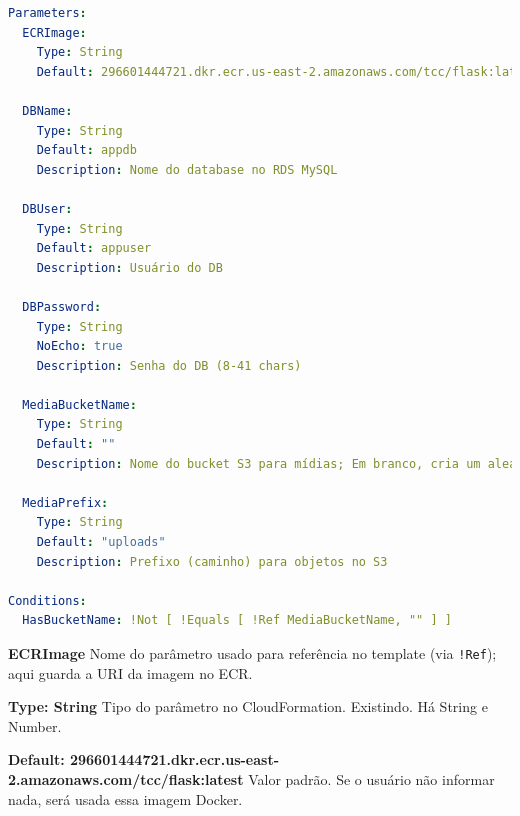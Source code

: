 \begin{lstlisting}[language=YAML]
Parameters:
  ECRImage:
    Type: String
    Default: 296601444721.dkr.ecr.us-east-2.amazonaws.com/tcc/flask:latest

  DBName:
    Type: String
    Default: appdb
    Description: Nome do database no RDS MySQL

  DBUser:
    Type: String
    Default: appuser
    Description: Usuário do DB

  DBPassword:
    Type: String
    NoEcho: true
    Description: Senha do DB (8-41 chars)

  MediaBucketName:
    Type: String
    Default: ""
    Description: Nome do bucket S3 para mídias; Em branco, cria um aleatório 

  MediaPrefix:
    Type: String
    Default: "uploads"
    Description: Prefixo (caminho) para objetos no S3

Conditions:
  HasBucketName: !Not [ !Equals [ !Ref MediaBucketName, "" ] ]
\end{lstlisting}


\textbf{ECRImage} Nome do parâmetro usado para referência no template (via \texttt{!Ref}); aqui guarda a URI da imagem no ECR.

\textbf{Type: String} Tipo do parâmetro no CloudFormation. Existindo. Há String e Number.

\textbf{Default: 296601444721.dkr.ecr.us-east-2.amazonaws.com/tcc/flask:latest} Valor padrão. Se o usuário não informar nada, será usada essa imagem Docker.